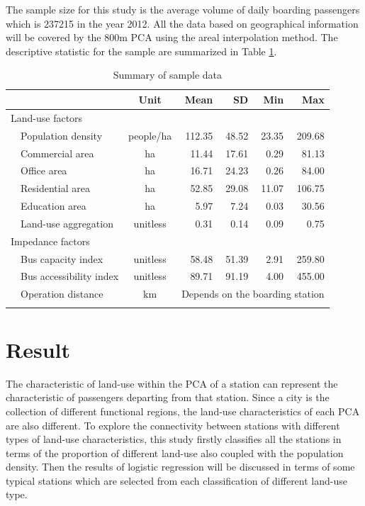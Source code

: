 \documentclass[utf8]{article}
\begin{document}
The sample size for this study is the average volume of daily boarding passengers which is 237215 in the year 2012. All the data based on geographical information will be covered by the 800m PCA using the areal interpolation method. The descriptive statistic for the sample are summarized in Table \ref{tab:DataDescription}.

\begin{table}[htbp]
	\centering
	\caption{Summary of sample data}
	\begin{tabular}{llcrrrr}
		\Xhline{1.5pt}
		& & Unit & Mean & SD & Min & Max \\
		\midrule
		
		\multicolumn{2}{l}{Land-use factors} & & & & &\\
		& Population density & people/ha & 112.35 & 48.52 & 23.35 & 209.68 \\
		& Commercial area & ha & 11.44 & 17.61 & 0.29 & 81.13 \\
		& Office area & ha & 16.71 & 24.23 & 0.26 & 84.00 \\
		& Residential area & ha & 52.85 & 29.08 & 11.07 & 106.75 \\
		& Education area & ha & 5.97 & 7.24 & 0.03 & 30.56 \\
		& Land-use aggregation & unitless & 0.31 & 0.14 & 0.09 & 0.75 \\
		
		\multicolumn{2}{l}{Impedance factors} & & & & &\\
		& Bus capacity index & unitless & 58.48 & 51.39 & 2.91 & 259.80 \\
		& Bus accessibility index & unitless & 89.71 & 91.19 & 4.00 & 455.00 \\
		& Operation distance & km & \multicolumn{4}{c}{Depends on the boarding station} \\
		\Xhline{1.5pt}
	\end{tabular}%
	\label{tab:DataDescription}%
\end{table}%



\section{Result}
\indent

%
The characteristic of land-use within the PCA of a station can represent the characteristic of passengers departing from that station. Since a city is the collection of different functional regions, the land-use characteristics of each PCA are also different. To explore the connectivity between stations with different types of land-use characteristics, this study firstly classifies all the stations in terms of the proportion of different land-use also coupled with the population density. Then the results of logistic regression will be discussed in terms of some typical stations which are selected from each classification of different land-use type. 
\end{document}

